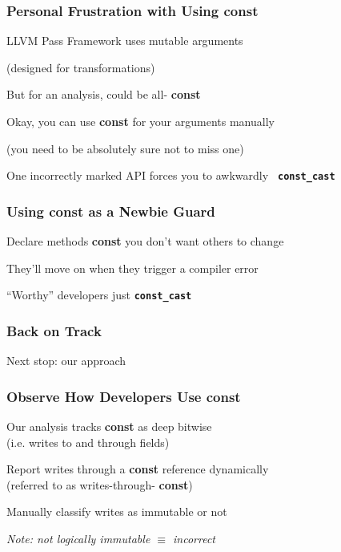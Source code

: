 \documentclass[aspectratio=43]{beamer}
\newcommand{\const}{{\color{blue} \bfseries \ttfamily const}}
\begin{document}
  \begin{frame}
    \frametitle{Personal Frustration with Using \const{}}

    LLVM Pass Framework uses mutable arguments

    (designed for transformations)

    But for an analysis, could be all-\const{}

    \vspace{2em}
    Okay, you can use \const{} for your arguments manually

    (you need to be absolutely sure not to miss one)

    \vspace{2em}
    One incorrectly marked API forces you to awkwardly \texttt{\color{blue} \bfseries const\_cast}
  \end{frame}

  \begin{frame}
    \frametitle{Using \const{} as a Newbie Guard}

    Declare methods \const{} you don't want others to change

    \vspace{2em}
    They'll move on when they trigger a compiler error

    \vspace{2em}
    ``Worthy'' developers just {\bfseries \color{blue} \texttt{const\_cast}}
  \end{frame}

  \begin{frame}
    \frametitle{Back on Track}

    Next stop: our approach
  \end{frame}

  \begin{frame}
    \frametitle{Observe How Developers Use \const{}}

    \large

    Our analysis tracks \const{} as deep bitwise
    \\(i.e. writes to and through fields)

    \vspace{2em}
    Report writes through a \const{} reference dynamically
    \\(referred to as writes-through-\const{})

    \vspace{2em}
    {\color{yellow} Manually classify writes as  immutable
    or not}

    \vspace{2em}
    \textit{Note: not logically immutable $\equiv$ incorrect}
  \end{frame}
\end{document}
